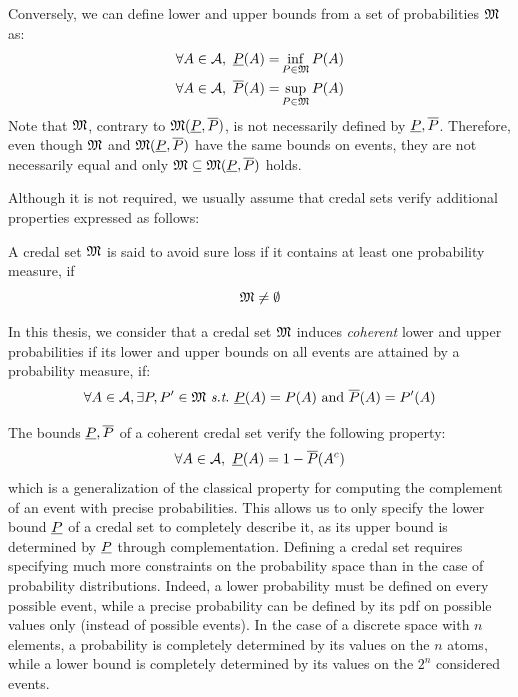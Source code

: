 Conversely, we can define lower and upper bounds from a set of probabilities $\mathfrak{M}$ as:
\begin{align*}
    \forall A\in\mathcal{A},~\underline{P}(A) =& \inf_{P\in\mathfrak{M}}P(A)\\
    \forall A\in\mathcal{A},~\overline{P}(A) =& \sup_{P\in\mathfrak{M}}P(A)
\end{align*}
Note that $\mathfrak{M}$, contrary to $\mathfrak{M}(\underline{P}, \overline{P})$, is not necessarily defined by $\underline{P}, \overline{P}$. Therefore, even though $\mathfrak{M}$ and $\mathfrak{M}(\underline{P},\overline{P})$ have the same bounds on events, they are not necessarily equal and only $\mathfrak{M}\subseteq\mathfrak{M}(\underline{P}, \overline{P})$ holds. 

Although it is not required, we usually assume that credal sets verify additional properties expressed as follows:
\begin{definition}\label{def:coherence_sure_loss}
    A credal set $\mathfrak{M}$ is said to avoid sure loss if it contains at least one probability measure, \ie if
    \begin{equation}
        \mathfrak{M} \neq \emptyset\label{eq:avoid_sure_loss}
    \end{equation}
    
    In this thesis, we consider that a credal set $\mathfrak{M}$ induces \textit{coherent} lower and upper probabilities if its lower and upper bounds on all events are attained by a probability measure, \ie if:
    \begin{equation}
        \forall A\in\mathcal{A}, \exists P, P'\in\M~\st~\low(A)=P(A) \text{ and } \overline{P}(A)=P'(A) 
    \end{equation}
\end{definition}
The bounds $\underline{P}, \overline{P}$ of a coherent credal set verify the following property:
\begin{equation}
    \forall A\in\mathcal{A}, ~\underline{P}(A) = 1 - \overline{P}(A^c)\label{eq:lower_proba_complement}
\end{equation}
which is a generalization of the classical property for computing the complement of an event with precise probabilities. This allows us to only specify the lower bound $\underline{P}$ of a credal set to completely describe it, as its upper bound is determined by $\underline{P}$ through complementation. Defining a credal set requires specifying much more constraints on the probability space than in the case of probability distributions. Indeed, a lower probability must be defined on every possible event, while a precise probability can be defined by its \acrshort{pdf} on possible values only (instead of possible events). In the case of a discrete space with $n$ elements, a probability is completely determined by its values on the $n$ atoms, while a lower bound is completely determined by its values on the $2^n$ considered events.


